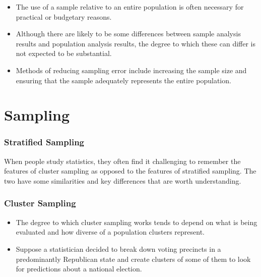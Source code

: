 ﻿\documentclass[]{report}
\begin{document}
\begin{itemize}
\item The use of a sample relative to an entire population is often necessary for practical or budgetary reasons. 
\item Although there are likely to be some differences between sample analysis results and population analysis results, the degree to which these can 
differ is not expected to be substantial. 
\end{itemize}



\begin{itemize}
\item Methods of reducing sampling error include increasing the sample size and ensuring that the sample adequately represents the entire population.
\end{itemize}


\newpage
\chapter{Sampling}


\subsection{Stratified Sampling}

When people study statistics, they often find it challenging to remember the features of cluster sampling as opposed to the features of stratified sampling. The two have some similarities and key differences that are worth understanding. 




\subsection{Cluster Sampling}

\begin{itemize}
\item The degree to which cluster sampling works tends to depend on what is being evaluated and how diverse of a population clusters represent.
\item  Suppose a statistician decided to break down voting precincts in a predominantly Republican state and create clusters of some of them to look for predictions about a national election.
\end{itemize}
\end{document}
